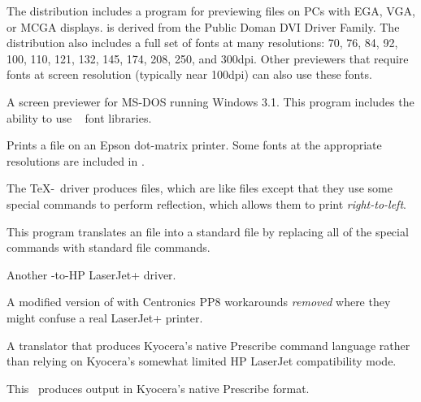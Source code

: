 The  distribution includes a program for previewing
 files on PCs with EGA, VGA, or MCGA displays.
 is derived from the Public Doman DVI Driver Family.
\pagebreak
The  distribution also includes a full set of 
fonts at many resolutions: 70, 76, 84, 92, 100, 110, 121, 132, 145,
174, 208, 250, and 300dpi.  Other previewers that require 
fonts at screen resolution (typically near 100dpi) can also use these
fonts.


A screen previewer for MS-DOS running Windows 3.1.  This program includes
the ability to use \emTeX\  font libraries.

\goodbreak
{}

Prints a  file on an Epson dot-matrix printer.  Some 
fonts at the appropriate resolutions are included in
.


The \TeX-\XeT\ driver produces  files, which are like 
files except that they use some special commands to perform reflection,
which allows them to print {\em right-to-left}.

This program translates an  file into a standard  file
by replacing all of the special commands with standard  file
commands.


Another -to-HP LaserJet+ driver.


A modified version of  with Centronics PP8 workarounds
\textit{removed} where they might confuse a real LaserJet+ printer.


A  translator that produces Kyocera's native Prescribe
command language rather than relying on Kyocera's somewhat limited
HP LaserJet compatibility mode.


This \dvidriver\ produces output in Kyocera's native Prescribe format.


